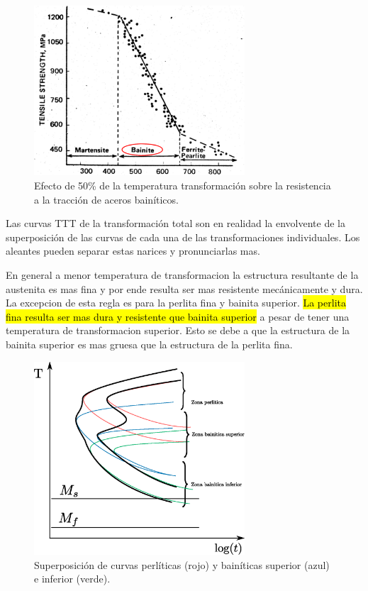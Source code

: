 \begin{figure}[htb!]
    \centering
    \includegraphics[width=0.7\textwidth]{fig/RmVsBainitaMartensita.PNG}
    \caption{Efecto de 50\% de la temperatura transformación sobre la resistencia a la tracción de aceros bainíticos.}
    \label{fig:RmVsBainitaMartensita}
\end{figure}

Las curvas TTT de la transformación total son en realidad la envolvente de la superposición de las curvas de cada una de las transformaciones individuales. Los aleantes pueden separar estas narices y pronunciarlas mas.

En general a menor temperatura de transformacion la estructura resultante de la austenita es mas fina y por ende resulta ser mas resistente mecánicamente y dura. La excepcion de esta regla es para la perlita fina y bainita superior. \hl{La perlita fina resulta ser mas dura y resistente que bainita superior} a pesar de tener una temperatura de transformacion superior. Esto se debe a que la estructura de la bainita superior es mas gruesa que la estructura de la perlita fina.

\begin{figure}[htb!]
    \centering
    \includegraphics[width=0.7\textwidth]{fig/TTTsuperpuesta.eps}
    \caption{Superposición de curvas perlíticas (rojo) y bainíticas superior (azul) e inferior (verde).}
    \label{fig:TTTsuperpuestas}
\end{figure}

